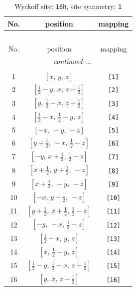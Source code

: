 \documentclass[fleqn,8pt]{jsarticle}
\begin{document}
\begin{longtable}{ccc}
\caption{Wyckoff site: {\tt 16h}, site symmetry: {\tt 1}}
 \\
 \hline \hline
No. & position & mapping \\ \hline \endfirsthead

\multicolumn{2}{l}{\tablename\ \thetable{}} \\
 \hline \hline
No. & position & mapping \\ \hline \endhead

 \hline \hline
\multicolumn{2}{r}{\footnotesize\it continued ...} \\ \endfoot

 \hline \hline
\multicolumn{2}{r}{} \\ \endlastfoot

1 & $\left[ x,\, y,\, z \right]$ & {\tt [1]} \\ \hline
2 & $\left[ \frac{1}{2} - y,\, x,\, z + \frac{1}{2} \right]$ & {\tt [2]} \\ \hline
3 & $\left[ y,\, \frac{1}{2} - x,\, z + \frac{1}{2} \right]$ & {\tt [3]} \\ \hline
4 & $\left[ \frac{1}{2} - x,\, \frac{1}{2} - y,\, z \right]$ & {\tt [4]} \\ \hline
5 & $\left[ - x,\, - y,\, - z \right]$ & {\tt [5]} \\ \hline
6 & $\left[ y + \frac{1}{2},\, - x,\, \frac{1}{2} - z \right]$ & {\tt [6]} \\ \hline
7 & $\left[ - y,\, x + \frac{1}{2},\, \frac{1}{2} - z \right]$ & {\tt [7]} \\ \hline
8 & $\left[ x + \frac{1}{2},\, y + \frac{1}{2},\, - z \right]$ & {\tt [8]} \\ \hline
9 & $\left[ x + \frac{1}{2},\, - y,\, - z \right]$ & {\tt [9]} \\ \hline
10 & $\left[ - x,\, y + \frac{1}{2},\, - z \right]$ & {\tt [10]} \\ \hline
11 & $\left[ y + \frac{1}{2},\, x + \frac{1}{2},\, \frac{1}{2} - z \right]$ & {\tt [11]} \\ \hline
12 & $\left[ - y,\, - x,\, \frac{1}{2} - z \right]$ & {\tt [12]} \\ \hline
13 & $\left[ \frac{1}{2} - x,\, y,\, z \right]$ & {\tt [13]} \\ \hline
14 & $\left[ x,\, \frac{1}{2} - y,\, z \right]$ & {\tt [14]} \\ \hline
15 & $\left[ \frac{1}{2} - y,\, \frac{1}{2} - x,\, z + \frac{1}{2} \right]$ & {\tt [15]} \\ \hline
16 & $\left[ y,\, x,\, z + \frac{1}{2} \right]$ & {\tt [16]} \\
\end{longtable}
\end{document}
